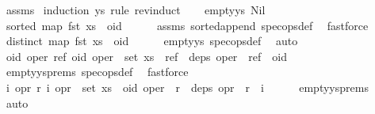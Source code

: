 \begin{isabellebody}
%
\isadelimproof
%
\endisadelimproof
%
\isatagproof
{}\isamarkupfalse%
\ assms\ \isamarkupfalse%
{\isacharparenleft}induction\ ys\ rule{\isacharcolon}\ rev{\isacharunderscore}induct{\isacharparenright}\isanewline
\ \ \isamarkupfalse%
\ empty{\isacharunderscore}ys{\isacharcolon}\ Nil\isanewline
\ \ \isamarkupfalse%
\ {\isachardoublequoteopen}sorted\ {\isacharparenleft}{\isacharparenleft}map\ fst\ xs{\isacharparenright}\ {\isacharat}\ {\isacharbrackleft}oid{\isacharbrackright}{\isacharparenright}{\isachardoublequoteclose}\isanewline
\ \ \ \ \isamarkupfalse%
\ assms{\isacharparenleft}{}{\isacharparenright}\ sorted{\isacharunderscore}append\ spec{\isacharunderscore}ops{\isacharunderscore}def\ \isamarkupfalse%
\ fastforce\isanewline
\ \ \isamarkupfalse%
\ \isamarkupfalse%
\ {\isachardoublequoteopen}distinct\ {\isacharparenleft}{\isacharparenleft}map\ fst\ xs{\isacharparenright}\ {\isacharat}\ {\isacharbrackleft}oid{\isacharbrackright}{\isacharparenright}{\isachardoublequoteclose}\isanewline
\ \ \ \ \isamarkupfalse%
\ empty{\isacharunderscore}ys\ spec{\isacharunderscore}ops{\isacharunderscore}def\ \isamarkupfalse%
\ auto\isanewline
\ \ \isamarkupfalse%
\ \isamarkupfalse%
\ {\isachardoublequoteopen}{\isasymforall}oid\ oper\ ref{\isachardot}\ {\isacharparenleft}oid{\isacharcomma}\ oper{\isacharparenright}\ {\isasymin}\ set\ xs\ {\isasymand}\ ref\ {\isasymin}\ deps\ oper\ {\isasymlongrightarrow}\ ref\ {\isacharless}\ oid{\isachardoublequoteclose}\isanewline
\ \ \ \ \isamarkupfalse%
\ empty{\isacharunderscore}ys{\isachardot}prems{\isacharparenleft}{}{\isacharparenright}\ spec{\isacharunderscore}ops{\isacharunderscore}def\ \isamarkupfalse%
\ fastforce\isanewline
\ \ \isamarkupfalse%
\ {\isachardoublequoteopen}{\isasymforall}i\ opr\ r{\isachardot}\ {\isacharparenleft}i{\isacharcomma}\ opr{\isacharparenright}\ {\isasymin}\ set\ {\isacharparenleft}xs\ {\isacharat}\ {\isacharbrackleft}{\isacharparenleft}oid{\isacharcomma}\ oper{\isacharparenright}{\isacharbrackright}{\isacharparenright}\ {\isasymand}\ r\ {\isasymin}\ deps\ opr\ {\isasymlongrightarrow}\ r\ {\isacharless}\ i{\isachardoublequoteclose}\isanewline
\ \ \ \ \isamarkupfalse%
\ empty{\isacharunderscore}ys{\isachardot}prems{\isacharparenleft}{}{\isacharparenright}\ \isamarkupfalse%
\ auto\isanewline

\end{isabellebody}
